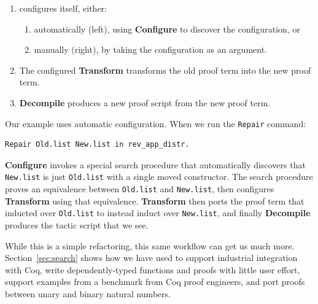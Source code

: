 \begin{enumerate}
\item \toolname configures itself, either:
\begin{enumerate}
\item automatically (left), using \textbf{Configure} to discover the configuration, or
\item manually (right), by taking the configuration as an argument.
\end{enumerate}
\item The configured \textbf{Transform} transforms the old proof term into the new proof term.
\item \textbf{Decompile} produces a new proof script from the new proof term.
\end{enumerate}

Our example uses automatic configuration. When we run the \lstinline{Repair} command:

\begin{lstlisting}
Repair Old.list New.list in rev_app_distr.
\end{lstlisting}
\textbf{Configure} invokes a special search procedure that automatically discovers that \lstinline{New.list}
is just \lstinline{Old.list} with a single moved constructor.
The search procedure proves an equivalence between \lstinline{Old.list} and \lstinline{New.list},
then configures \textbf{Transform} using that equivalence.
\textbf{Transform} then ports the proof term that inducted over \lstinline{Old.list}
to instead induct over \lstinline{New.list}, and finally
\textbf{Decompile} produces the tactic script that we see.

While this is a simple refactoring, this same workflow can get us much more.
Section~\ref{sec:search} shows how we have used \toolname to support industrial integration with Coq,
write dependently-typed functions and proofs with little user effort,
support examples from a benchmark from Coq proof engineers,
and port proofs between unary and binary natural numbers.


